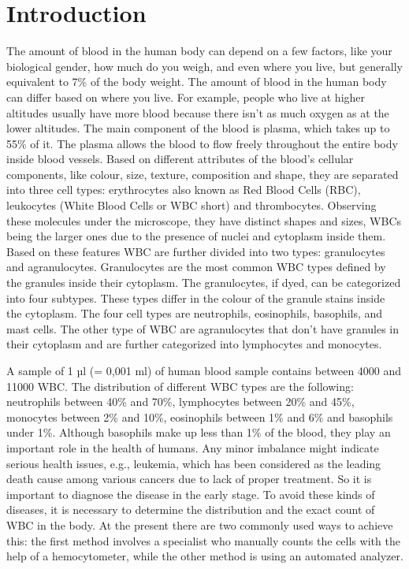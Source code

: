 \section{Introduction}
The amount of blood in the human body can depend on a few factors, like your biological gender, how much do you weigh, and even where you live, but generally equivalent to 7\% of the body weight. The amount of blood in the human body can differ based on where you live. For example, people who live at higher altitudes usually have more blood because there isn’t as much oxygen as at the lower altitudes. The main component of the blood is plasma, which takes up to 55\% of it.
The plasma allows the blood to flow freely throughout the entire body inside blood vessels. Based on different attributes of the blood’s cellular components, like colour, size, texture, composition and shape, they are separated into three cell types: erythrocytes also known as Red Blood Cells (RBC), leukocytes (White Blood Cells or WBC short) and thrombocytes. Observing these molecules under the microscope, they have distinct shapes and sizes, WBCs being the larger ones due to the presence of nuclei and cytoplasm inside them. 
Based on these features WBC are further divided into two types: granulocytes and agranulocytes. 
Granulocytes are the most common WBC types defined by the granules inside their cytoplasm. The granulocytes, if dyed, can be categorized into four subtypes. These types differ in the colour of the granule stains inside the cytoplasm. The four cell types are neutrophils, eosinophils, basophils, and mast cells. The other type of WBC are agranulocytes that don't have granules in their cytoplasm and are further categorized into lymphocytes and monocytes.


A sample of 1 µl (= 0,001 ml) of human blood sample contains between 4000 and 11000 WBC. The distribution of different WBC types are the following: neutrophils between 40\% and 70\%, lymphocytes between 20\% and 45\%, monocytes between 2\% and 10\%, eosinophils between 1\% and 6\% and basophils under 1\%. Although basophils make up less than 1\% of the blood, they play an important role in the health of humans. Any minor imbalance might indicate serious health issues, e.g., leukemia, 
which has been considered as the leading death cause among various cancers due to lack of proper treatment. So it is important to diagnose the disease in the early stage. To avoid these kinds of diseases, it is necessary to determine the distribution and the exact count of WBC in the body. At the present there are two commonly used ways to achieve this: the first method involves a specialist who manually counts the cells with the help of a hemocytometer, while the other method is using an automated analyzer.

